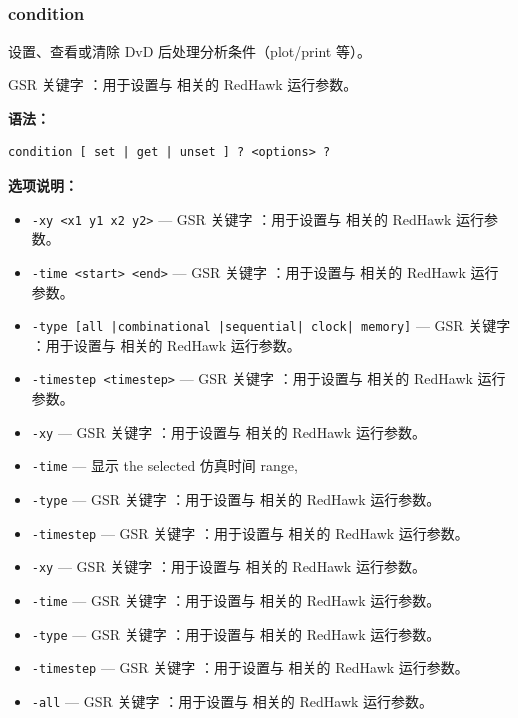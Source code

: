 \subsection{}
\subsubsection*{condition}

设置、查看或清除 DvD 后处理分析条件（plot/print 等）。

GSR 关键字 ：用于设置与  相关的 RedHawk 运行参数。

\textbf{语法：}
\begin{lstlisting}
condition [ set | get | unset ] ? <options> ?
\end{lstlisting}

\textbf{选项说明：}
\begin{itemize}
\item \texttt{-xy <x1 y1 x2 y2>} — GSR 关键字 ：用于设置与  相关的 RedHawk 运行参数。
\item \texttt{-time <start> <end>} — GSR 关键字 ：用于设置与  相关的 RedHawk 运行参数。
\item \texttt{-type [all |combinational |sequential| clock| memory]} — GSR 关键字 ：用于设置与  相关的 RedHawk 运行参数。
\item \texttt{-timestep <timestep>} — GSR 关键字 ：用于设置与  相关的 RedHawk 运行参数。
\item \texttt{-xy} — GSR 关键字 ：用于设置与  相关的 RedHawk 运行参数。
\item \texttt{-time} — 显示 the selected 仿真时间 range,
\item \texttt{-type} — GSR 关键字 ：用于设置与  相关的 RedHawk 运行参数。
\item \texttt{-timestep} — GSR 关键字 ：用于设置与  相关的 RedHawk 运行参数。
\item \texttt{-xy} — GSR 关键字 ：用于设置与  相关的 RedHawk 运行参数。
\item \texttt{-time} — GSR 关键字 ：用于设置与  相关的 RedHawk 运行参数。
\item \texttt{-type} — GSR 关键字 ：用于设置与  相关的 RedHawk 运行参数。
\item \texttt{-timestep} — GSR 关键字 ：用于设置与  相关的 RedHawk 运行参数。
\item \texttt{-all} — GSR 关键字 ：用于设置与  相关的 RedHawk 运行参数。
\end{itemize}

\subsection{}
